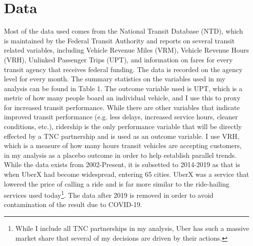 \documentclass [12pt]{report}
\begin{document}
\section*{Data}
Most of the data used comes from the National Transit Database (NTD), which  is maintained by the Federal Transit Authority and reports on several transit related variables, including Vehicle Revenue Miles (VRM), Vehicle Revenue Hours (VRH), Unlinked Passenger Trips (UPT), and information on fares for every transit agency that receives federal funding. The data is recorded on the agency level for every month. The summary statistics on the variables used in my analysis can be found in Table 1. The outcome variable used is UPT, which is a metric of how many people board an individual vehicle, and I use this to proxy for increased transit performance. While there are other variables that indicate improved transit performance (e.g. less delays, increased service hours, cleaner conditions, etc.), ridership is the only performance variable that will be directly effected by a TNC partnership and is used as an outcome variable. I use VRH, which is a measure of how many hours transit vehicles are accepting customers, in my analysis as a placebo outcome in order to help establish parallel trends. \\
\indent While the data exists from 2002-Present, it is subsetted to 2014-2019 as that is when UberX had become widespread, entering 65 cities. UberX was a service that lowered the price of calling a ride and is far more similar to the ride-hailing services used today\footnote{While I include all TNC partnerships in my analysis, Uber has such a massive market share that several of my decisions are driven by their actions.}. The data after 2019 is removed in order to avoid contamination of the result due to COVID-19. \\
\end{document}
